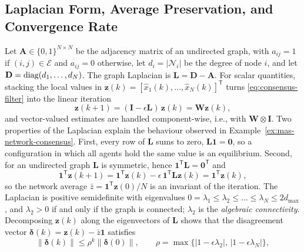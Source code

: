 \subsection{Laplacian Form, Average Preservation, and Convergence Rate}
\label{subsec:mas-laplacian}

Let $\mathbf{A}\in\{0,1\}^{N\times N}$ be the adjacency matrix of an undirected graph, with $a_{ij}=1$ if $(i,j)\in\mathcal{E}$ and $a_{ij}=0$ otherwise, let $d_i=|\mathcal{N}_i|$ be the degree of node $i$, and let $\mathbf{D}=\operatorname{diag}(d_1,\dots,d_N)$. The graph Laplacian is $\mathbf{L}=\mathbf{D}-\mathbf{A}$. For scalar quantities, stacking the local values in $\mathbf{z}(k)=[\widehat{x}_1(k),\dots,\widehat{x}_N(k)]^{\mathsf T}$ turns \eqref{eq:consensus-filter} into the linear iteration
\begin{equation}
\mathbf{z}(k+1)=(\mathbf{I}-\epsilon\mathbf{L})\,\mathbf{z}(k)=\mathbf{W}\mathbf{z}(k),
\label{eq:consensus-laplacian}
\end{equation}
and vector-valued estimates are handled component-wise, i.e., with $\mathbf{W}\otimes\mathbf{I}$. Two properties of the Laplacian explain the behaviour observed in Example~\ref{ex:mas-network-consensus}. First, every row of $\mathbf{L}$ sums to zero, $\mathbf{L}\mathbf{1}=\mathbf{0}$, so a configuration in which all agents hold the same value is an equilibrium. Second, for an undirected graph $\mathbf{L}$ is symmetric, hence $\mathbf{1}^{\mathsf T}\mathbf{L}=\mathbf{0}^{\mathsf T}$ and
\begin{equation}
\mathbf{1}^{\mathsf T}\mathbf{z}(k+1)=\mathbf{1}^{\mathsf T}\mathbf{z}(k)-\epsilon\,\mathbf{1}^{\mathsf T}\mathbf{L}\mathbf{z}(k)=\mathbf{1}^{\mathsf T}\mathbf{z}(k),
\label{eq:consensus-average-preserved}
\end{equation}
so the network average $\bar{z}=\mathbf{1}^{\mathsf T}\mathbf{z}(0)/N$ is an invariant of the iteration. The Laplacian is positive semidefinite with eigenvalues $0=\lambda_1\le\lambda_2\le\dots\le\lambda_N\le 2d_{\max}$, and $\lambda_2>0$ if and only if the graph is connected; $\lambda_2$ is the \emph{algebraic connectivity}. Decomposing $\mathbf{z}(k)$ along the eigenvectors of $\mathbf{L}$ shows that the disagreement vector $\boldsymbol{\delta}(k)=\mathbf{z}(k)-\bar{z}\mathbf{1}$ satisfies
\begin{equation}
\|\boldsymbol{\delta}(k)\|\le\rho^{k}\|\boldsymbol{\delta}(0)\|,\qquad
\rho=\max\{|1-\epsilon\lambda_2|,\,|1-\epsilon\lambda_N|\},
\label{eq:consensus-rate}
\end{equation}
